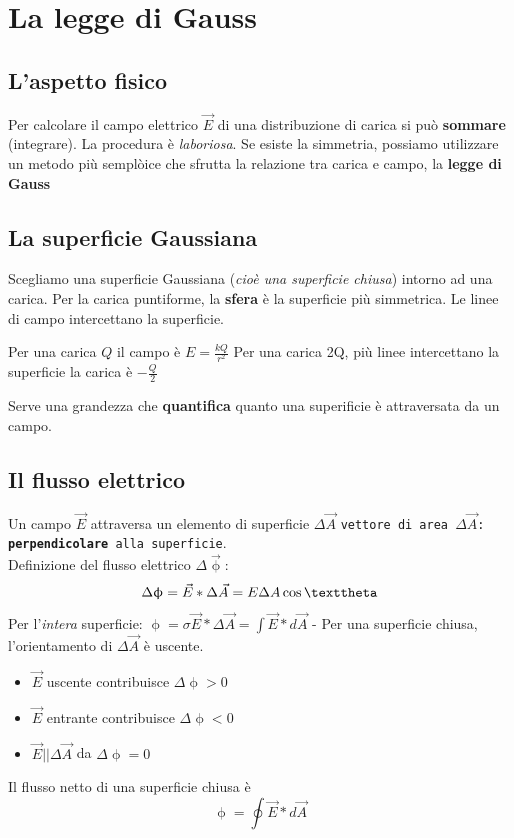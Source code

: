 \chapter{La legge di Gauss}
\section{L'aspetto fisico}
Per calcolare il campo elettrico $\vec{E}$ di una distribuzione di carica si può \textbf{sommare} (integrare). La procedura è \textit{laboriosa}. Se esiste la simmetria, possiamo utilizzare un metodo più semplòice che sfrutta la relazione tra carica e campo, la \textbf{legge di Gauss}
\section{La superficie Gaussiana}
Scegliamo una superficie Gaussiana ({\it cioè una superficie chiusa}) intorno ad una carica.
Per la carica puntiforme, la {\bf sfera} è la superficie più simmetrica.
Le linee di campo intercettano la superficie.
\begin{tasks}
  \task Per una carica $Q$ il campo è $E=\frac{kQ}{r^2}$
  \task Per una carica 2Q, più linee intercettano la superficie
  \task la carica è $-\frac{Q}{2}$
\end{tasks}
Serve una grandezza che \textbf{quantifica} quanto una superificie è attraversata da un campo.
\section {Il flusso elettrico}
Un campo $\vec{E}$ attraversa un elemento di superficie $\Delta \vec{A}$ \texttt{vettore di area $\Delta \vec{A}$: \textbf{perpendicolare} alla superficie}.\\ Definizione del flusso elettrico $\Delta \vec{\upphi}$:
\begin{equation}
	\Delta \upphi =\vec{E}*\Delta\vec{A}=E\Delta A\cos\texttheta
\end{equation}
Per l'\textit{intera} superficie:
$\upphi = \sigma \vec{E}*\Delta \vec{A}=\int \vec{E}*d\vec{A}$ - Per una superficie chiusa, l'orientamento di $\Delta \vec{A}$ è uscente.
\begin{itemize}
\item $\vec{E}$ uscente contribuisce $\Delta \upphi >0$
\item $\vec{E}$ entrante contribuisce $\Delta \upphi <0$
\item $\vec{E} || \Delta \vec{A}$ da $\Delta \upphi =0$
\end{itemize}
Il flusso netto di una superficie chiusa è
\begin{equation}
	\upphi=\oint \vec{E}*d\vec{A}
\end{equation}
